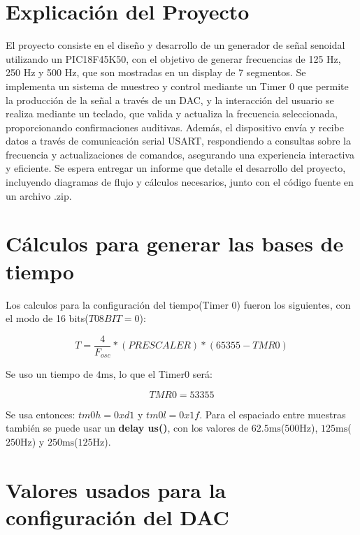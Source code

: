 \section{Explicación del Proyecto}

El proyecto consiste en el diseño y desarrollo de un generador de señal senoidal utilizando un PIC18F45K50, con el objetivo de generar frecuencias de 125 Hz, 250 Hz y 500 Hz, que son mostradas en un display de 7 segmentos. Se implementa un sistema de muestreo y control mediante un Timer 0 que permite la producción de la señal a través de un DAC, y la interacción del usuario se realiza mediante un teclado, que valida y actualiza la frecuencia seleccionada, proporcionando confirmaciones auditivas. Además, el dispositivo envía y recibe datos a través de comunicación serial USART, respondiendo a consultas sobre la frecuencia y actualizaciones de comandos, asegurando una experiencia interactiva y eficiente. Se espera entregar un informe que detalle el desarrollo del proyecto, incluyendo diagramas de flujo y cálculos necesarios, junto con el código fuente en un archivo .zip.

\section{Cálculos para generar las bases de tiempo}

Los calculos para la configuración del tiempo(Timer 0) fueron los siguientes, con el modo de 16 bits($T08BIT = 0$):

\begin{equation*}
    T = \frac{4}{F_{osc}} \ast (PRESCALER) \ast(65355-TMR0)
\end{equation*}

Se uso un tiempo de $4\si{\milli\second}$, lo que el Timer0 será: 

\begin{equation*}
    TMR0 = 53355
\end{equation*}

Se usa entonces: $tm0h = 0xd1$ y $tm0l = 0x1f$. Para el espaciado entre muestras también se puede usar un \textbf{delay us()}, con los valores de $62.5\si{\milli\second}$($500\si{\Hz}$), $125\si{\milli\second}$($250\si{\Hz}$) y $250\si{\milli\second}$($125\si{\Hz}$).

\section{Valores usados para la configuración del DAC}

